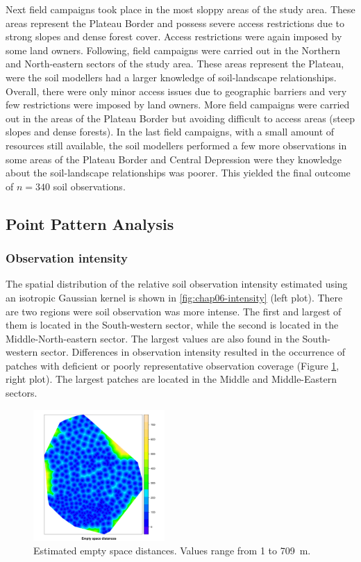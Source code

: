 Next field campaigns took place in the most sloppy areas of the study area. These areas represent the Plateau 
Border and possess severe access restrictions due to strong slopes and dense forest cover. Access restrictions 
were again imposed by some land owners. Following, field campaigns were carried out in the Northern and 
North-eastern sectors of the study area. These areas represent the Plateau, were the soil modellers had a 
larger knowledge of soil-landscape relationships. Overall, there were only minor access issues due to 
geographic barriers and very few restrictions were imposed by land owners. More field campaigns were carried 
out in the areas of the Plateau Border but avoiding difficult to access areas (steep slopes and dense forests).
In the last field campaigns, with a small amount of resources still available, the soil modellers performed a 
few more observations in some areas of the Plateau Border and Central Depression were they knowledge about the 
soil-landscape relationships was poorer. This yielded the final outcome of $n = 340$ soil observations.





\subsection{Point Pattern Analysis}

\subsubsection{Observation intensity}

The spatial distribution of the relative soil observation intensity estimated using an isotropic Gaussian 
kernel is shown in \autoref{fig:chap06-intensity} (left plot). There are two regions were soil observation was 
more intense. The first and largest of them is located in the South-western sector, while the second is 
located in the Middle-North-eastern sector. The largest values are also found in the South-western sector. 
Differences in observation intensity resulted in the occurrence of patches with deficient or poorly 
representative observation coverage (Figure \ref{fig:chap06-intensity}, right plot). The largest patches are 
located in the Middle and Middle-Eastern sectors.

\begin{figure}[!ht]
 \centering
 \includegraphics[width=5cm]{fig/chap06-empty-space}
 \caption{Estimated empty space distances. Values range from \num{1} to \SI{709}{\m}.}
\label{fig:chap06-intensity}
\end{figure}

